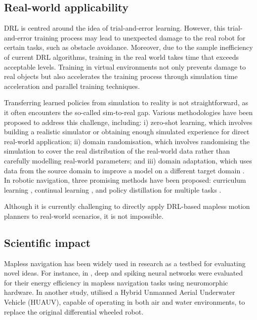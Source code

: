\subsection{Real-world applicability}

DRL is centred around the idea of trial-and-error learning. However, this trial-and-error training process may lead to unexpected damage to the real robot for certain tasks, such as obstacle avoidance. Moreover, due to the sample inefficiency of current DRL algorithms, training in the real world takes time that exceeds acceptable levels. Training in virtual environments not only prevents damage to real objects but also accelerates the training process through simulation time acceleration and parallel training techniques.

Transferring learned policies from simulation to reality is not straightforward, as it often encounters the so-called sim-to-real gap. Various methodologies have been proposed to address this challenge, including: i) zero-shot learning, which involves building a realistic simulator or obtaining enough simulated experience for direct real-world application; ii) domain randomisation, which involves randomising the simulation to cover the real distribution of the real-world data rather than carefully modelling real-world parameters; and iii) domain adaptation, which uses data from the source domain to improve a model on a different target domain \cite{ref:sim2real}. In robotic navigation, three promising methods have been proposed: curriculum learning \cite{ref:energy-efficient}, continual learning \cite{ref:sim2real}, and policy distillation for multiple tasks \cite{ref:sim2real}.

Although it is currently challenging to directly apply DRL-based mapless motion planners to real-world scenarios, it is not impossible.

\subsection{Scientific impact}

Mapless navigation has been widely used in research as a testbed for evaluating novel ideas. For instance, in \cite{ref:energy-efficient}, deep and spiking neural networks were evaluated for their energy efficiency in mapless navigation tasks using neuromorphic hardware. In another study, \cite{ref:huauv} utilised a Hybrid Unmanned Aerial Underwater Vehicle (HUAUV), capable of operating in both air and water environments, to replace the original differential wheeled robot.


